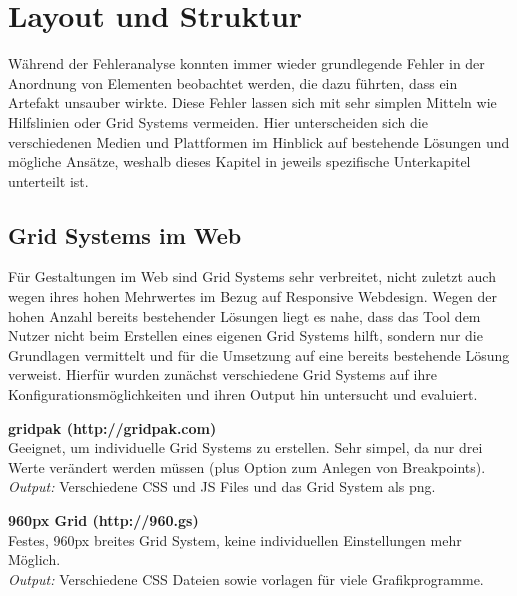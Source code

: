 
\chapter{Layout und Struktur} %

\label{LayoutStruktur} %



Während der Fehleranalyse konnten immer wieder grundlegende Fehler in der Anordnung von Elementen beobachtet werden, die dazu führten, dass ein Artefakt unsauber wirkte.
Diese Fehler lassen sich mit sehr simplen Mitteln wie Hilfslinien oder Grid Systems vermeiden.
Hier unterscheiden sich die verschiedenen Medien und Plattformen im Hinblick auf bestehende Lösungen und mögliche Ansätze, weshalb dieses Kapitel in jeweils spezifische Unterkapitel unterteilt ist.

\section{Grid Systems im Web}
Für Gestaltungen im Web sind Grid Systems sehr verbreitet, nicht zuletzt auch wegen ihres hohen Mehrwertes im Bezug auf Responsive Webdesign.
Wegen der hohen Anzahl bereits bestehender Lösungen liegt es nahe, dass das Tool dem Nutzer nicht beim Erstellen eines eigenen Grid Systems hilft, sondern nur die Grundlagen vermittelt und für die Umsetzung auf eine bereits bestehende Lösung verweist.
Hierfür wurden zunächst verschiedene Grid Systems auf ihre Konfigurationsmöglichkeiten und ihren Output hin untersucht und evaluiert.

\textbf{gridpak (http://gridpak.com)} \\
Geeignet, um individuelle Grid Systems zu erstellen. Sehr simpel, da nur drei Werte verändert werden müssen (plus Option zum Anlegen von Breakpoints). \\
\textit{Output:} Verschiedene CSS und JS Files und das Grid System als png.

\textbf{960px Grid (http://960.gs)} \\
Festes, 960px breites Grid System, keine individuellen Einstellungen mehr Möglich. \\
\textit{Output:} Verschiedene CSS Dateien sowie vorlagen für viele Grafikprogramme.

